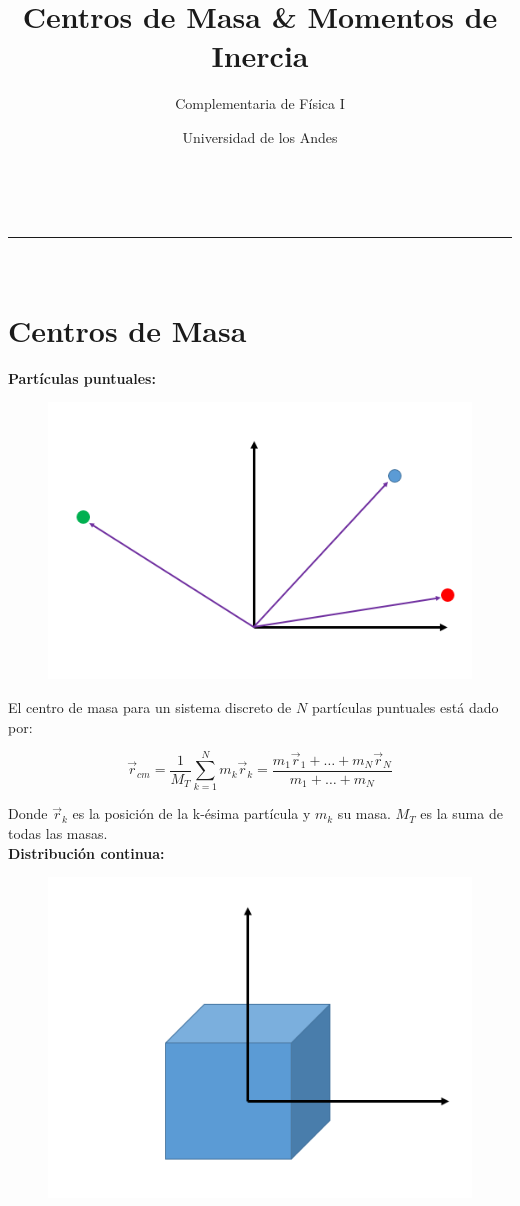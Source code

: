 \documentclass[a4paper,11pt]{article}
\makeatletter
\newcommand{\linia}{\rule{\linewidth}{0.5pt}}
\theoremstyle{mytheor}
\renewcommand{\maketitle}{
	\begin{center}
	\vspace{2ex}
	{\huge \textsc{\@title}}
	\vspace{1ex}
	\\
	\linia\\
	\@author \hfill \@date
	\vspace{4ex}
	\end{center}
}
\makeatother
\begin{document}
\title{ Centros de Masa \& Momentos de Inercia}

\author{Complementaria de Física I}

\date{ Universidad de los Andes}

\maketitle

\section{Centros de Masa}

\textbf{Partículas puntuales:}


\begin{figure}[h]
	\includegraphics[width=0.5\linewidth]{masaspuntuales}
	\label{fcN4}
\end{figure}

El centro de masa para un sistema discreto de $N$ partículas puntuales  está dado por:

$$ \vec{r}_{cm} = \frac{1}{M_{T}}\sum_{k=1}^{N} m_k \vec{r}_k = \frac{m_1\vec{r}_1 + \dots + m_N \vec{r}_N}{m_1 + \dots + m_N}$$


Donde $ \vec{r}_k$ es la posición de la k-ésima partícula y $m_k$ su masa. $M_T$ es la suma de todas las masas.\\

\textbf{Distribución continua:}

\begin{figure}[h]
	\includegraphics[width=0.5\linewidth]{3d}
	\label{fcN4}
\end{figure}
\end{document}
